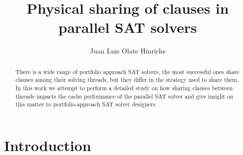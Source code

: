 \documentclass[12pt]{diicc}
\title{\bf Physical sharing of clauses in parallel SAT solvers}
\author{Juan Luis Olate Hinrichs}
\begin{document}
\frontmatter

%


%
\begin{abstract}
There is a wide range of portfolio approach SAT solvers, the most successful ones share clauses among their solving threads, but they differ in the strategy used to share them. In this work we attempt to perform a detailed study on how sharing clauses between threads impacts the cache performance of the parallel SAT solver and give insight on this matter to portfolio-approach SAT solver designers. 
\end{abstract}

%
% 
\mainmatter
\chapter{Introduction}\label{chap:intro}
\end{document}
